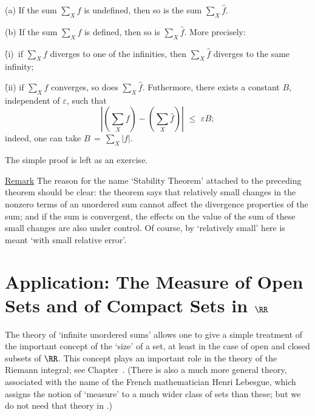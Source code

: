 \V

        (a) If the sum $\sum_{X} f$ is undefined, then so is the sum $\sum_{X} \hat{f}$.

\V

        (b) If the sum $\sum_{X} f$ is defined, then so is $\sum_{X} \hat{f}$. More precisely:

    \h (i)\, if $\sum_{X} f$ diverges to one of the infinities, then $\sum_{X} \hat{f}$ diverges to the same infinity;

    \h (ii) if $\sum_{X} f$ converges, so does $\sum_{X} \hat{f}$. Futhermore, there exists a constant $B$, independent of ${\varepsilon}$, such that
        \begin{displaymath}
        \left|\left(\sum_{X} f\right) - \left(\sum_{X} \hat{f}\right)\right|\,\,{\leq}\,\,{\varepsilon}B;
        \end{displaymath}
    indeed, one can take $B \,=\, \sum_{X} |f|$.

\V

        The simple proof is left as an exercise.

        \V

        \underline{Remark} The reason for the name `Stability Theorem' attached to the preceding theorem should be clear:
    the theorem says that relatively small changes in the nonzero terms of an unordered sum cannot affect the divergence properties of the sum;
    and if the sum is convergent, the effects on the value of the sum of these small changes are also under control.
    Of course, by `relatively small' here is meant `with small relative error'.



                \section{{\bf Application: The Measure of Open Sets and of Compact Sets in ${\RR}$}}
                \label{SectG25}

\V

        The theory of `infinite unordered sums' allows one to give a simple treatment of the important concept of the `size' of a set,
    at least in the case of open and closed subsets of ${\RR}$.
    This concept plays an important role in the theory of the Riemann integral; see Chapter~.
    (There is also a much more general theory, associated with the name of the French mathematician Henri Lebesgue,
    which assigns the notion of `measure' to a much wider class of sets than these; but we do not need that theory in {\TheseNotes}.)

